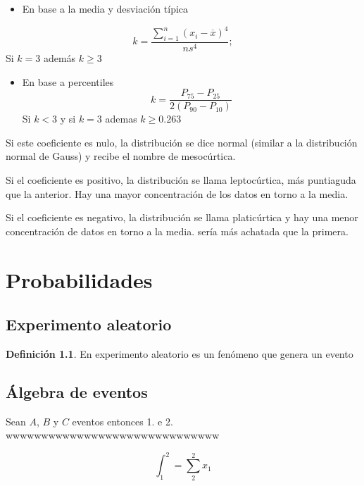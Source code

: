 \documentclass[
  11pt,
]{krantz}
\providecommand{\tightlist}{%
  \setlength{\itemsep}{0pt}\setlength{\parskip}{0pt}}
\theoremstyle{definition}
\newtheorem{definition}{Definición}[chapter]
\theoremstyle{definition}
\theoremstyle{definition}
\theoremstyle{definition}
\theoremstyle{remark}
\begin{document}
\begin{itemize}
\tightlist
\item
  En base a la media y desviación típica
\end{itemize}

\[k= \frac{\sum_{i=1}^{n}\left( x_i-\overline{x}\right)^4 }{ns^4};\] Si \(k=3\) además \(k\geq 3\)

\begin{itemize}
\tightlist
\item
  En base a percentiles
  \[k= \frac{P_{75}-P_{25}}{2\left( P_{90}-P_{10} \right) }\] Si \(k<3\) y si \(k=3\) ademas \(k\geq 0.263\)
\end{itemize}

Si este coeficiente es nulo, la distribución se dice normal (similar a la distribución normal de Gauss) y recibe el nombre de mesocúrtica.

Si el coeficiente es positivo, la distribución se llama leptocúrtica, más puntiaguda que la anterior. Hay una mayor concentración de los datos en torno a la media.

Si el coeficiente es negativo, la distribución se llama platicúrtica y hay una menor concentración de datos en torno a la media. sería más achatada que la primera.

\hypertarget{part-probabilidades}{%
\part{Probabilidades}\label{part-probabilidades}}

\hypertarget{experimento-aleatorio}{%
\chapter{Experimento aleatorio}\label{experimento-aleatorio}}

\begin{definition}
\protect\hypertarget{def:www}{}\label{def:www}En experimento aleatorio es un fenómeno que genera un evento
\end{definition}

\hypertarget{uxe1lgebra-de-eventos}{%
\chapter{Álgebra de eventos}\label{uxe1lgebra-de-eventos}}

Sean \(A\), \(B\) y \(C\) eventos entonces 1. e 2. wwwwwwwwwwwwwwwwwwwwwwwwwwwwww

\[ \int_{1}^{2}=\sum_{2}^{2}x_1 \]
\end{document}
